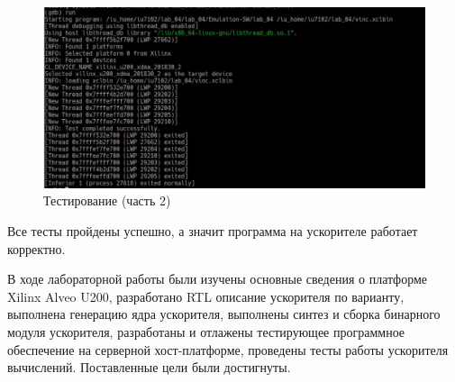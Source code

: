\begin{figure}[H]
	\begin{center}
		\includegraphics[scale=0.6]{assets/gdb_finish.png}
	\end{center}
	\caption{Тестирование (часть 2)}
\end{figure}

Все тесты пройдены успешно, а значит программа на ускорителе работает корректно.


В ходе лабораторной работы были изучены основные сведения о платформе Xilinx Alveo U200, разработано RTL описание ускорителя по варианту, выполнена генерацию ядра ускорителя, выполнены синтез и сборка бинарного модуля ускорителя, разработаны и отлажены тестирующее программное обеспечение на серверной хост-платформе, проведены
тесты работы ускорителя вычислений. Поставленные цели были достигнуты.

